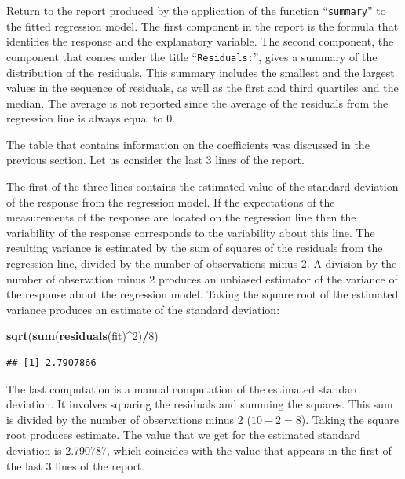 \documentclass[]{krantz}
\makeatletter
\newenvironment{Shaded}{\begin{snugshade}}{\end{snugshade}}
\newcommand{\KeywordTok}[1]{\textcolor[rgb]{0.13,0.29,0.53}{\textbf{#1}}}
\newcommand{\DecValTok}[1]{\textcolor[rgb]{0.00,0.00,0.81}{#1}}
\newcommand{\OperatorTok}[1]{\textcolor[rgb]{0.81,0.36,0.00}{\textbf{#1}}}
\newcommand{\NormalTok}[1]{#1}
\newenvironment{kframe}{%
\medskip{}
\setlength{\fboxsep}{.8em}
 \def\at@end@of@kframe{}%
 \ifinner\ifhmode%
  \def\at@end@of@kframe{\end{minipage}}%
  \begin{minipage}{\columnwidth}%
 \fi\fi%
 \def\FrameCommand##1{\hskip\@totalleftmargin \hskip-\fboxsep
 \colorbox{shadecolor}{##1}\hskip-\fboxsep
     \hskip-\linewidth \hskip-\@totalleftmargin \hskip\columnwidth}%
 \MakeFramed {\advance\hsize-\width
   \@totalleftmargin\z@ \linewidth\hsize
   \@setminipage}}%
 {\par\unskip\endMakeFramed%
 \at@end@of@kframe}
\renewenvironment{Shaded}{\begin{kframe}}{\end{kframe}}
\theoremstyle{definition}
\theoremstyle{definition}
\theoremstyle{definition}
\theoremstyle{remark}
\makeatother
\begin{document}
Return to the report produced by the application of the function
``\texttt{summary}'' to the fitted regression model. The first component
in the report is the formula that identifies the response and the
explanatory variable. The second component, the component that comes
under the title ``\texttt{Residuals:}'', gives a summary of the
distribution of the residuals. This summary includes the smallest and
the largest values in the sequence of residuals, as well as the first
and third quartiles and the median. The average is not reported since
the average of the residuals from the regression line is always equal to
0.

The table that contains information on the coefficients was discussed in
the previous section. Let us consider the last 3 lines of the report.

The first of the three lines contains the estimated value of the
standard deviation of the response from the regression model. If the
expectations of the measurements of the response are located on the
regression line then the variability of the response corresponds to the
variability about this line. The resulting variance is estimated by the
sum of squares of the residuals from the regression line, divided by the
number of observations minus 2. A division by the number of observation
minus 2 produces an unbiased estimator of the variance of the response
about the regression model. Taking the square root of the estimated
variance produces an estimate of the standard deviation:

\begin{Shaded}
\begin{Highlighting}[]
\KeywordTok{sqrt}\NormalTok{(}\KeywordTok{sum}\NormalTok{(}\KeywordTok{residuals}\NormalTok{(fit)}\OperatorTok{^}\DecValTok{2}\NormalTok{)}\OperatorTok{/}\DecValTok{8}\NormalTok{)}
\end{Highlighting}
\end{Shaded}

\begin{verbatim}
## [1] 2.7907866
\end{verbatim}

The last computation is a manual computation of the estimated standard
deviation. It involves squaring the residuals and summing the squares.
This sum is divided by the number of observations minus 2 (\(10-2=8\)).
Taking the square root produces estimate. The value that we get for the
estimated standard deviation is 2.790787, which coincides with the value
that appears in the first of the last 3 lines of the report.
\end{document}

